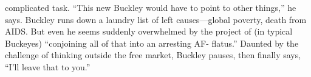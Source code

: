 complicated task. “This new Buckley would have to point to other things,” he says. Buckley runs down a laundry list of left causes—global poverty, death from AIDS. But even he seems suddenly overwhelmed by the project of (in typical Buckeyes) “conjoining all of that into an arresting AF- flatus.” Daunted by the challenge of thinking outside the free market, Buckley pauses, then finally says, “I’ll leave that to you.”{\par}